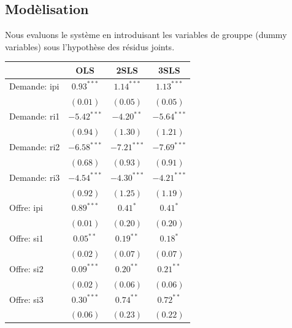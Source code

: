 \documentclass[11pt,]{article}
\begin{document}
\FloatBarrier

\hypertarget{modelisation-1}{%
\subsection{Modèlisation}\label{modelisation-1}}

\FloatBarrier

Nous evaluons le système en introduisant les variables de grouppe (dummy
variables) sous l'hypothèse des résidus joints.

\FloatBarrier

\FloatBarrier

\begin{table}[!htbp]
\begin{center}
\begin{tabular}{l c c c }
\hline
 & OLS & 2SLS & 3SLS \\
\hline
Demande: ipi        & $0.93^{***}$  & $1.14^{***}$  & $1.13^{***}$  \\
                    & $(0.01)$      & $(0.05)$      & $(0.05)$      \\
Demande: ri1        & $-5.42^{***}$ & $-4.20^{**}$  & $-5.64^{***}$ \\
                    & $(0.94)$      & $(1.30)$      & $(1.21)$      \\
Demande: ri2        & $-6.58^{***}$ & $-7.21^{***}$ & $-7.69^{***}$ \\
                    & $(0.68)$      & $(0.93)$      & $(0.91)$      \\
Demande: ri3        & $-4.54^{***}$ & $-4.30^{***}$ & $-4.21^{***}$ \\
                    & $(0.92)$      & $(1.25)$      & $(1.19)$      \\
Offre: ipi          & $0.89^{***}$  & $0.41^{*}$    & $0.41^{*}$    \\
                    & $(0.01)$      & $(0.20)$      & $(0.20)$      \\
Offre: si1          & $0.05^{**}$   & $0.19^{**}$   & $0.18^{*}$    \\
                    & $(0.02)$      & $(0.07)$      & $(0.07)$      \\
Offre: si2          & $0.09^{***}$  & $0.20^{**}$   & $0.21^{**}$   \\
                    & $(0.02)$      & $(0.06)$      & $(0.06)$      \\
Offre: si3          & $0.30^{***}$  & $0.74^{**}$   & $0.72^{**}$   \\
                    & $(0.06)$      & $(0.23)$      & $(0.22)$      \\

\end{tabular}
\end{center}
\end{table}
\end{document}
